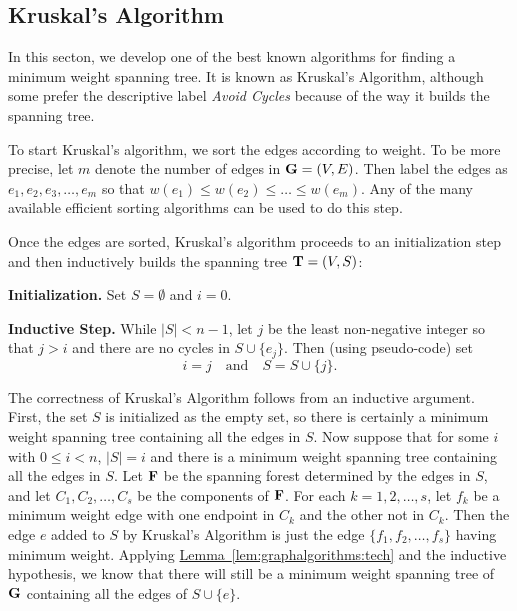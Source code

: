 \subsection{Kruskal's Algorithm}

In this secton, we develop one of the best known algorithms for
finding a minimum weight spanning tree.  It is known as Kruskal's
Algorithm, although some prefer the descriptive label \textit{Avoid
  Cycles} because of the way it builds the spanning tree.

To start Kruskal's algorithm, we sort the edges according to weight.
To be more precise, let $m$ denote the number of edges in $\mathbf{G}=(V,E)$.
Then label the edges as $e_1,e_2,e_3,\dots,e_m$ so that $w(e_1)\le
w(e_2)\le \dots \le w(e_m)$. Any of the many available efficient
sorting algorithms can be used to do this step.

Once the edges are sorted, Kruskal's algorithm proceeds to an
initialization step and then inductively builds the spanning tree
$\mathbf{T}=(V,S)$:

\medskip
\textbf{Initialization.}\quad
Set $S=\emptyset$ and $i=0$.

\medskip
\textbf{Inductive Step.}\quad
While $|S| < n-1$, let $j$ be the least non-negative
integer so that $j > i$ and there are no cycles in
$S\cup\{e_j\}$.  Then (using pseudo-code) set
\[
i = j\quad\text{and}\quad S= S\cup\{j\}.
\]

The correctness of Kruskal's Algorithm follows from an inductive
argument. First, the set $S$ is initialized as the empty set, so there
is certainly a minimum weight spanning tree containing all the edges
in $S$.  Now suppose that for some $i$ with $0\le i <n$, $|S|=i$ and
there is a minimum weight spanning tree containing all the edges in
$S$.  Let $\mathbf{F}$ be the spanning forest determined by the edges in
$S$, and let $C_1, C_2,\dots,C_s$ be the components of $\mathbf{F}$.  For
each $k=1,2,\dots,s$, let $f_k$ be a minimum weight edge with one
endpoint in $C_k$ and the other not in $C_k$.  Then the edge $e$ added
to $S$ by Kruskal's Algorithm is just the edge $\{f_1,f_2,\dots,f_s\}$
having minimum weight. Applying
\hyperref[lem:graphalgorithms:tech]{Lemma~\ref*{lem:graphalgorithms:tech}}
and the inductive hypothesis, we know that there will still be a
minimum weight spanning tree of $\mathbf{G}$ containing all the edges of
$S\cup\{e\}$.

